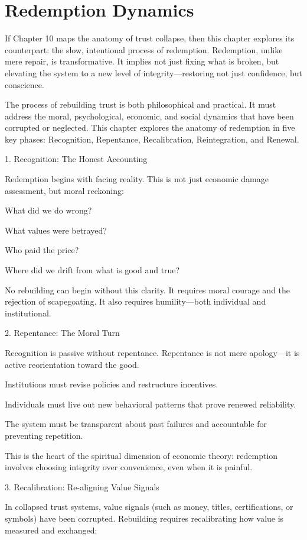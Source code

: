 \documentclass[11pt,oneside]{book}
\begin{document}
\chapter{Redemption Dynamics}

If Chapter 10 maps the anatomy of trust collapse, then this chapter explores its counterpart: the slow, intentional process of redemption. Redemption, unlike mere repair, is transformative. It implies not just fixing what is broken, but elevating the system to a new level of integrity—restoring not just confidence, but conscience.

The process of rebuilding trust is both philosophical and practical. It must address the moral, psychological, economic, and social dynamics that have been corrupted or neglected. This chapter explores the anatomy of redemption in five key phases: Recognition, Repentance, Recalibration, Reintegration, and Renewal.

1. Recognition: The Honest Accounting


Redemption begins with facing reality. This is not just economic damage assessment, but moral reckoning:

    What did we do wrong?

    What values were betrayed?

    Who paid the price?

    Where did we drift from what is good and true?

No rebuilding can begin without this clarity. It requires moral courage and the rejection of scapegoating. It also requires humility—both individual and institutional.

2. Repentance: The Moral Turn


Recognition is passive without repentance. Repentance is not mere apology—it is active reorientation toward the good.

    Institutions must revise policies and restructure incentives.

    Individuals must live out new behavioral patterns that prove renewed reliability.

    The system must be transparent about past failures and accountable for preventing repetition.

This is the heart of the spiritual dimension of economic theory: redemption involves choosing integrity over convenience, even when it is painful.

3. Recalibration: Re-aligning Value Signals


In collapsed trust systems, value signals (such as money, titles, certifications, or symbols) have been corrupted. Rebuilding requires recalibrating how value is measured and exchanged:
\end{document}

